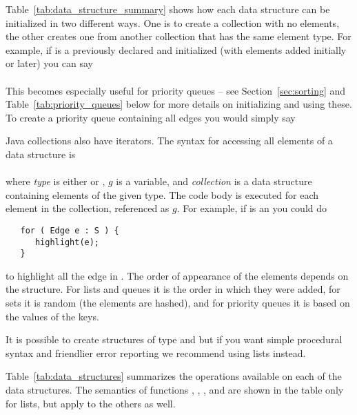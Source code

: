 Table~\ref{tab:data_structure_summary} shows how each data structure can be
initialized in two different ways. One is to create a collection with no
elements, the other creates one from another collection that has the same
element type. For example, if  is a previously declared and initialized
 (with elements added initially or later) you can say\\
\hspace*{1em}\\
This becomes especially useful for priority queues -- see
Section~\ref{sec:sorting} and Table~\ref{tab:priority_queues} below for more
details on initializing and using these.
To create a priority queue containing all edges you would simply say\\
\hspace*{1em}

Java collections also have iterators. The syntax for accessing all elements
of a data structure is\\
\hspace*{1em}\\
where \emph{type} is either  or , $g$ is a variable,
and \emph{collection} is a data structure containing elements of the given
type. The code body is executed for each element in the collection,
referenced as $g$. For example, if  is an  you could do

\begin{minipage}{\textwidth}
\begin{verbatim}
   for ( Edge e : S ) {
      highlight(e);
   }
\end{verbatim}
\end{minipage}

to highlight all the edge in .
The order of appearance of the elements depends on the structure.
For lists and queues it is the order in which they were added, for sets it is
random (the elements are hashed), and for priority queues it is based on the
values of the keys.

It is possible to create structures of type  and
 but if you want simple procedural syntax and friendlier error reporting
we recommend using lists instead.

Table~\ref{tab:data_structures} summarizes the operations available on each
of the data structures.
The semantics of functions , , , and
 are shown in the table only for lists, but apply to the others as well.

